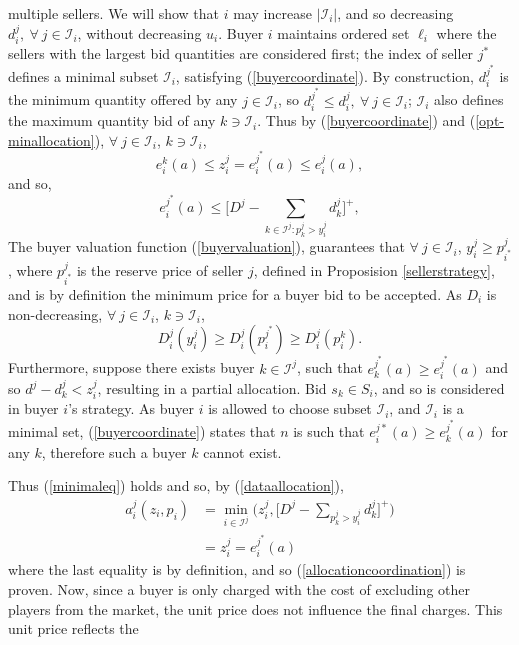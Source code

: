 \documentclass[12pt]{article}
\theoremstyle{definition}
\newcommand{\mcI}{\mathcal{I}}
\begin{document}
\begin{multicols}{2}
multiple sellers.
We will show that $i$ may increase $\vert\mcI_i\vert$, and so decreasing
$d_i^j, \ \forall \ j\in\mcI_i$, without decreasing $u_i$.
Buyer $i$ maintains ordered set $\ell_i$ where the sellers with the
largest bid quantities are considered first; the index of seller $j^*$ defines
a minimal subset $\mcI_i$, satisfying (\ref{buyercoordinate}). By construction, 
$d_i^{j^*}$ is the minimum quantity offered by any $j\in \mcI_i$,
so $d_i^{j^*} \le d_i^j, \ \forall \ j \in \mcI_i$; $\mcI_i$ also defines the
maximum quantity bid of any $k \ni \mcI_i$.
Thus by (\ref{buyercoordinate}) and (\ref{opt-minallocation}), $\forall \ j\in \mcI_i$,
$k\ni\mcI_i$,
$$
    e_i^k(a) \le z_i^j = e_i^{j^*}(a) \le e_i^{j}(a),
$$
and so, 
\begin{equation}\label{minimaleq}
    e_i^{j^*}(a)  \le \bigg\lbrack D^{j} - \sum_{k\in \mcI^j : p_k^{j}> y_{i}^{j}} d_k^{j}\bigg\rbrack^+,
\end{equation}
The buyer valuation function (\ref{buyervaluation}), guarantees
that $\forall \ j\in\mcI_i$, $y_i^j \ge p_{i^*}^j$, where $p_{i^*}^j$ is the reserve price of seller $j$, defined in Proposision
\ref{sellerstrategy}, and is by definition the minimum price for a buyer bid to
be accepted. 
As $D_i$ is non-decreasing, $\forall \ j\in \mcI_i$,
$k\ni\mcI_i$,
$$
    D_i^j(y_i^j) \ge D_i^j(p_i^{j^*})\ge D_i^j(p_i^{k}).
$$
Furthermore, suppose there exists buyer $k\in \mcI^j$, such that
$e_k^{j^*}(a) \ge e_i^{j^*}(a)$ and so $d^j - d_k^j < z_i^{j}$, resulting in a
partial allocation. Bid $s_k \in S_i$, and so is considered in buyer $i$'s strategy. 
As buyer $i$ is allowed to choose subset $\mcI_i$, and $\mcI_i$ is a minimal
set, (\ref{buyercoordinate}) states that $n$ is such that $e_i^{j*}(a)
\ge e_k^{j^*}(a)$ for any $k$, therefore such a buyer $k$ cannot exist.
\iffalse
We have, $\forall \ j\in \mcI_i$, $k\ni\mcI_i$,
$$
    {\theta_i}'(e_i^{k}(a)) \ge {\theta_i}'(e_i^{j^*}(a)) \ge y_i^j.
$$
Now, suppose that $p_k^j = p_i^j$, however $d_k^j > d_i^j$...
\fi
Thus (\ref{minimaleq}) holds and so, by (\ref{dataallocation}),
\begin{align*}
     a_i^j(z_i,p_i) &=\min_{i\in\mcI^j}\bigg(z_i^j, \bigg\lbrack D^{j} - \sum_{p_k^{j}> y_i^{j}}
d_k^{j}\bigg\rbrack^+\bigg) \\
    &= z_i^{j}= e_i^{j^*}(a)
\end{align*}
where the last equality is by definition, and so (\ref{allocationcoordination}) is proven.
Now, since a buyer is only charged with the cost of excluding other players from the market, the
unit price does not influence the final charges. This unit price reflects the

\end{multicols}
\end{document}
